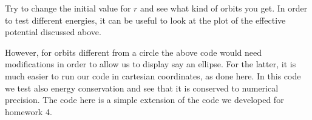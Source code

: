 \documentclass[letterpaper,10pt,english]{sphinxmanual}
\begin{document}
\begin{sphinxVerbatim}[commandchars=\\\{\}]
\PYG{p}{[}\PYG{p}{]}
\PYG{p}{[}\PYG{p}{]}
\PYG{p}{[}\PYG{p}{]}
\PYG{p}{[}\PYG{p}{]}

\end{sphinxVerbatim}

Try to change the initial value for \(r\) and see what kind of orbits you get.
In order to test different energies, it can be useful to look at the plot of the effective potential discussed above.

However, for orbits different from a circle the above code would need modifications in order to allow us to display say an ellipse. For the latter, it is much easier to run our code in cartesian coordinates, as done here. In this code we test also energy conservation and see that it is conserved to numerical precision. The code here is a simple extension of the code we developed for homework 4.
\end{document}
